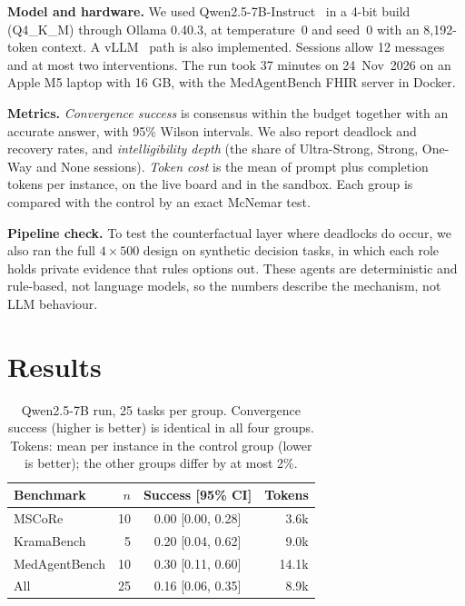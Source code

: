 \documentclass[11pt,a4paper,twocolumn]{article}
\begin{document}
\textbf{Model and hardware.} We used Qwen2.5-7B-Instruct~\cite{qwen25} in a 4-bit build
(Q4\_K\_M) through Ollama 0.40.3, at temperature~0 and seed~0 with an 8,192-token context. A
vLLM~\cite{kwon2023vllm} path is also implemented. Sessions allow 12 messages and at most two
interventions. The run took 37 minutes on 24~Nov~2026 on an Apple M5 laptop with 16 GB, with
the MedAgentBench FHIR server in Docker.

\textbf{Metrics.} \emph{Convergence success} is consensus within the budget together with an
accurate answer, with 95\% Wilson intervals. We also report deadlock and recovery rates, and
\emph{intelligibility depth} (the share of Ultra-Strong, Strong, One-Way and None sessions).
\emph{Token cost} is the mean of prompt plus completion tokens per instance, on the live board
and in the sandbox. Each group is compared with the control by an exact McNemar test.

\textbf{Pipeline check.} To test the counterfactual layer where deadlocks do occur, we also ran
the full $4\times500$ design on synthetic decision tasks, in which each role holds private
evidence that rules options out. These agents are deterministic and rule-based, not language
models, so the numbers describe the mechanism, not LLM behaviour.

\section{Results}
\begin{table}[t]
\centering
\small
\begin{tabular}{@{}lrcr@{}}
\toprule
Benchmark & $n$ & Success [95\% CI] & Tokens \\
\midrule
MSCoRe & 10 & 0.00 [0.00, 0.28] & 3.6k \\
KramaBench & 5 & 0.20 [0.04, 0.62] & 9.0k \\
MedAgentBench & 10 & 0.30 [0.11, 0.60] & 14.1k \\
All & 25 & 0.16 [0.06, 0.35] & 8.9k \\
\bottomrule
\end{tabular}
\caption{Qwen2.5-7B run, 25 tasks per group. Convergence success (higher is better) is identical
in all four groups. Tokens: mean per instance in the control group (lower is better); the other groups differ by at most 2\%.}
\label{tab:results}
\end{table}
\end{document}
